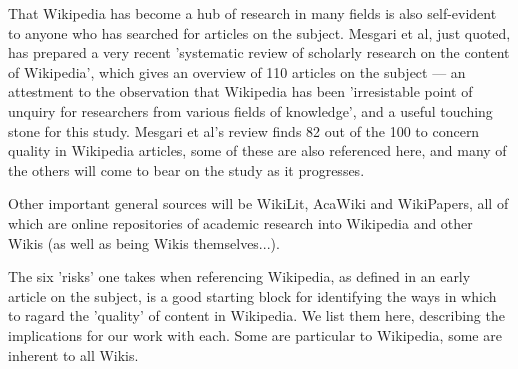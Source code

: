 \documentclass[a4paper,11pt,twoside,notitlepage]{article}
\begin{document}
        That Wikipedia has become a hub of research in many fields is
        also self-evident to anyone who has searched for articles on
        the subject. Mesgari et al, just quoted, has prepared a very
        recent 'systematic review of scholarly research on the content
        of Wikipedia', which gives an overview of 110 articles on the
        subject --- an attestment to the observation that Wikipedia
        has been 'irresistable point of unquiry for researchers from
        various fields of knowledge', and a useful touching stone for
        this study. Mesgari et al's review finds 82 out of the 100 to
        concern quality in Wikipedia articles, some of these are also
        referenced here, and many of the others will come to bear on
        the study as it progresses.

        Other important general sources will be WikiLit,\cite{wikilit}
        AcaWiki\cite{acawiki} and WikiPapers\cite{wikipapers}, all of
        which are online repositories of academic research into
        Wikipedia and other Wikis (as well as being Wikis
        themselves...).

        The six 'risks' one takes when referencing Wikipedia, as
        defined in an early article on the subject,\cite{Denning2005}
        is a good starting block for identifying the ways in which to
        ragard the 'quality' of content in Wikipedia. We list them
        here, describing the implications for our work with each. Some
        are particular to Wikipedia, some are inherent to all Wikis.
        
\end{document}
